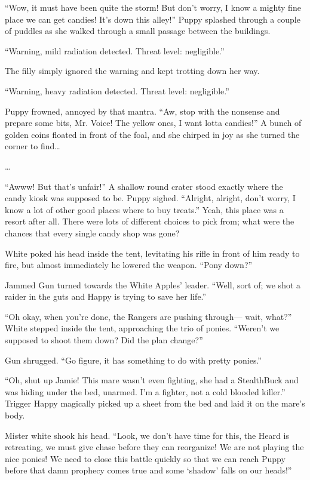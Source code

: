 ``Wow, it must have been quite the storm! But don't worry, I know a mighty fine place we can get candies! It's down this alley!'' Puppy splashed through a couple of puddles as she walked through a small passage between the buildings.

``{\mt Warning, mild radiation detected. Threat level: negligible.}''

The filly simply ignored the warning and kept trotting down her way.

``{\mt Warning, heavy radiation detected. Threat level: negligible.}''

Puppy frowned, annoyed by that mantra. ``Aw, stop with the nonsense and prepare some bits, Mr. Voice! The yellow ones, I want lotta candies!'' A bunch of golden coins floated in front of the foal, and she chirped in joy as she turned the corner to find\dots

\ldots{}

``Awww! But that's unfair!'' A shallow round crater stood exactly where the candy kiosk was supposed to be. Puppy sighed. ``Alright, alright, don't worry, I know a lot of other good places where to buy treats.'' Yeah, this place was a resort after all. There were lots of different choices to pick from; what were the chances that every single candy shop was gone?

\horizonline


White poked his head inside the tent, levitating his rifle in front of him ready to fire, but almost immediately he lowered the weapon. ``Pony down?''

Jammed Gun turned towards the White Apples' leader. ``Well, sort of; we shot a raider in the guts and Happy is trying to save her life.''

``Oh okay, when you're done, the Rangers are pushing through--- wait, what?'' White stepped inside the tent, approaching the trio of ponies. ``Weren't we supposed to shoot them down? Did the plan change?''

Gun shrugged. ``Go figure, it has something to do with pretty ponies.''

``Oh, shut up Jamie! This mare wasn't even fighting, she had a StealthBuck and was hiding under the bed, unarmed. I'm a fighter, not a cold blooded killer.'' Trigger Happy magically picked up a sheet from the bed and laid it on the mare's body.

Mister white shook his head. ``Look, we don't have time for this, the Heard is retreating, we must give chase before they can reorganize! We are not playing the nice ponies! We need to close this battle quickly so that we can reach Puppy before that damn prophecy comes true and some `shadow' falls on our heads!''

